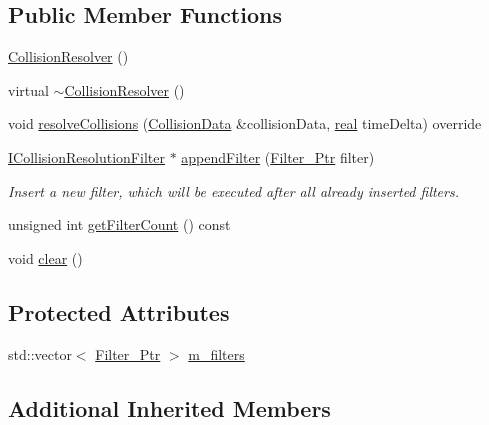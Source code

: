 \subsection*{Public Member Functions}
\begin{DoxyCompactItemize}
\item 
\mbox{\hyperlink{classr3_1_1_collision_resolver_a7b90e276403fa8422879228a189432fb}{Collision\+Resolver}} ()
\item 
virtual \mbox{\hyperlink{classr3_1_1_collision_resolver_ad172d58efecf5ef38f42020f21746f02}{$\sim$\+Collision\+Resolver}} ()
\item 
void \mbox{\hyperlink{classr3_1_1_collision_resolver_a134da5221d60b34c568f7de29c9d0a58}{resolve\+Collisions}} (\mbox{\hyperlink{classr3_1_1_collision_data}{Collision\+Data}} \&collision\+Data, \mbox{\hyperlink{namespacer3_ab2016b3e3f743fb735afce242f0dc1eb}{real}} time\+Delta) override
\item 
\mbox{\hyperlink{classr3_1_1_i_collision_resolution_filter}{I\+Collision\+Resolution\+Filter}} $\ast$ \mbox{\hyperlink{classr3_1_1_collision_resolver_a9409413937188dbd5332c3440c2a8834}{append\+Filter}} (\mbox{\hyperlink{classr3_1_1_collision_resolver_ad1c9ca40341498c0fe4d483d21c8eb9b}{Filter\+\_\+\+Ptr}} filter)
\begin{DoxyCompactList}\small\item\em Insert a new filter, which will be executed after all already inserted filters. \end{DoxyCompactList}\item 
unsigned int \mbox{\hyperlink{classr3_1_1_collision_resolver_ae56e2125e24982ad368f0d87e9c2a28f}{get\+Filter\+Count}} () const
\item 
void \mbox{\hyperlink{classr3_1_1_collision_resolver_a1f4e3d97afae66c03581807a529678cd}{clear}} ()
\end{DoxyCompactItemize}
\subsection*{Protected Attributes}
\begin{DoxyCompactItemize}
\item 
std\+::vector$<$ \mbox{\hyperlink{classr3_1_1_collision_resolver_ad1c9ca40341498c0fe4d483d21c8eb9b}{Filter\+\_\+\+Ptr}} $>$ \mbox{\hyperlink{classr3_1_1_collision_resolver_abf1234ad45ba7f114b31950c90ccaaff}{m\+\_\+filters}}
\end{DoxyCompactItemize}
\subsection*{Additional Inherited Members}


